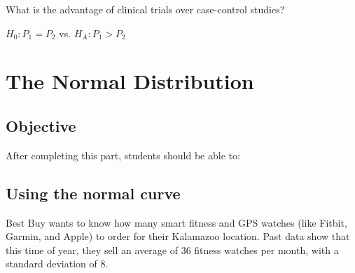 \documentclass[11pt, chapterprefix=true]{scrbook}\usepackage[]{graphicx}\usepackage[]{color}
\begin{document}
\begin{exercises}
\begin{exercise}
	\end{exercise}

	  \begin{exercise} %

What is the advantage of clinical trials over case-control studies?

  \end{exercise}
  \begin{solution}  %

    $H_0: P_1 = P_2$ vs. $H_A: P_1 > P_2$
  \end{solution}

\end{exercises}
\onecolumn



\chapter{The Normal Distribution}
\label{chap:ch6}

\section{Objective}

After completing this part, students should be able to:


\section{Using the normal curve} 

Best Buy wants to know how many smart fitness and GPS watches (like Fitbit, Garmin, and Apple) to order for their Kalamazoo location. Past data show that this time of year, they sell an average of 36 fitness watches per month, with a standard deviation of 8.
\end{document}
